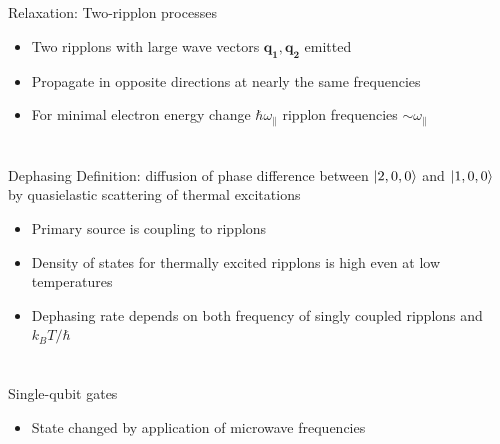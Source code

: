\documentclass{beamer}
\begin{document}
\section{}
\begin{frame}[t]{Relaxation: Two-ripplon processes}
    \begin{itemize} 
    \item Two ripplons with large wave vectors $\mathbf{q_1,q_2}$ emitted 
    \item Propagate in opposite directions at nearly the same frequencies 
    \item For minimal electron energy change $\hbar\omega_{\parallel}$ ripplon frequencies $\sim \omega_{\parallel}$ 
    \end{itemize}
\end{frame}

\section{}
\begin{frame}[t]{Dephasing}
    Definition: diffusion of phase difference between $\ket{2,0,0}$ and $\ket{1,0,0}$  by quasielastic scattering of thermal excitations
    \begin{itemize}
         \item Primary source is coupling to ripplons
         \item Density of states for thermally excited ripplons is high even at low temperatures
         \item Dephasing rate depends on both frequency of singly coupled ripplons and $k_B T/\hbar$
    \end{itemize}
\end{frame}

\section{}
\begin{frame}[t]{Single-qubit gates }
    \begin{itemize}
        \item State changed by application of microwave frequencies
    \end{itemize}
\end{frame}
\end{document}
